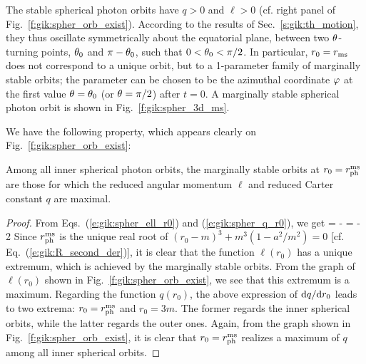 The stable spherical photon orbits have $q>0$ and $\ell > 0$
(cf. right panel of Fig.~\ref{f:gik:spher_orb_exist}).
According to the results of Sec.~\ref{s:gik:th_motion}, they
thus oscillate symmetrically about the equatorial plane, between
two $\theta$-turning points, $\theta_0$ and $\pi-\theta_0$, such that $0<\theta_0<\pi/2$.
In particular, $r_0 = r_{\rm ms}$ does not correspond to a unique orbit, but
to a 1-parameter family of marginally stable orbits; the parameter can be chosen
to be the azimuthal coordinate $\varphi$ at the first value $\theta=\theta_0$ (or $\theta=\pi/2$)
after $t=0$. A marginally stable spherical photon orbit is
shown in Fig.~\ref{f:gik:spher_3d_ms}.

We have the following property, which appears clearly on Fig.~\ref{f:gik:spher_orb_exist}:
\begin{greybox}
Among all inner spherical photon orbits, the marginally stable orbits
at $r_0 = r_{\rm ph}^{\rm ms}$ are those for which the reduced angular momentum $\ell$
and reduced Carter constant $q$ are maximal.
\end{greybox}
\begin{proof}
From Eqs.~(\ref{e:gik:spher_ell_r0}) and (\ref{e:gik:spher_q_r0}), we get
\be \label{e:gik:spher_orb_dqdr}
    = - 
\ee
\be
    = - 2 
\ee
Since $r_{\rm ph}^{\rm ms}$ is the unique real root of
$(r_0 - m)^3 + m^3 (1 - a^2/m^2) = 0$ [cf. Eq.~(\ref{e:gik:R_second_der})],
it is clear that the function $\ell(r_0)$ has a unique extremum, which is
achieved by the marginally stable orbits. From the graph of $\ell(r_0)$
shown in Fig.~\ref{f:gik:spher_orb_exist}, we see that this extremum is
a maximum. Regarding the function $q(r_0)$, the above expression of $\mathrm{d} q/\mathrm{d} r_0$
leads to two extrema: $r_0 = r_{\rm ph}^{\rm ms}$ and $r_0 = 3 m$.
The former regards the inner spherical orbits, while the latter regards
the outer ones. Again, from the graph shown in Fig.~\ref{f:gik:spher_orb_exist},
it is clear that $r_0 = r_{\rm ph}^{\rm ms}$ realizes a maximum of $q$
among all inner spherical orbits.
\end{proof}


